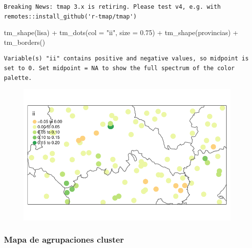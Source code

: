\documentclass[
  letterpaper,
  DIV=11,
  numbers=noendperiod]{scrreprt}
\newenvironment{Shaded}{\begin{snugshade}}{\end{snugshade}}
\newcommand{\AttributeTok}[1]{\textcolor[rgb]{0.40,0.45,0.13}{#1}}
\newcommand{\FloatTok}[1]{\textcolor[rgb]{0.68,0.00,0.00}{#1}}
\newcommand{\FunctionTok}[1]{\textcolor[rgb]{0.28,0.35,0.67}{#1}}
\newcommand{\NormalTok}[1]{\textcolor[rgb]{0.00,0.23,0.31}{#1}}
\newcommand{\SpecialCharTok}[1]{\textcolor[rgb]{0.37,0.37,0.37}{#1}}
\newcommand{\StringTok}[1]{\textcolor[rgb]{0.13,0.47,0.30}{#1}}
\begin{document}
\begin{verbatim}
Breaking News: tmap 3.x is retiring. Please test v4, e.g. with
remotes::install_github('r-tmap/tmap')
\end{verbatim}

\begin{Shaded}
\begin{Highlighting}[]
\FunctionTok{tm\_shape}\NormalTok{(lisa) }\SpecialCharTok{+}
    \FunctionTok{tm\_dots}\NormalTok{(}\AttributeTok{col =} \StringTok{"ii"}\NormalTok{, }\AttributeTok{size =} \FloatTok{0.75}\NormalTok{) }\SpecialCharTok{+}
\FunctionTok{tm\_shape}\NormalTok{(provincias) }\SpecialCharTok{+}
    \FunctionTok{tm\_borders}\NormalTok{()}
\end{Highlighting}
\end{Shaded}

\begin{verbatim}
Variable(s) "ii" contains positive and negative values, so midpoint is set to 0. Set midpoint = NA to show the full spectrum of the color palette.
\end{verbatim}

\begin{figure}[H]

{\centering \includegraphics{04_AutocorrelacionEspacial_files/figure-pdf/unnamed-chunk-16-1.pdf}

}

\end{figure}

\hypertarget{mapa-de-agrupaciones-cluster}{%
\subsubsection{Mapa de agrupaciones
cluster}\label{mapa-de-agrupaciones-cluster}}
\end{document}
